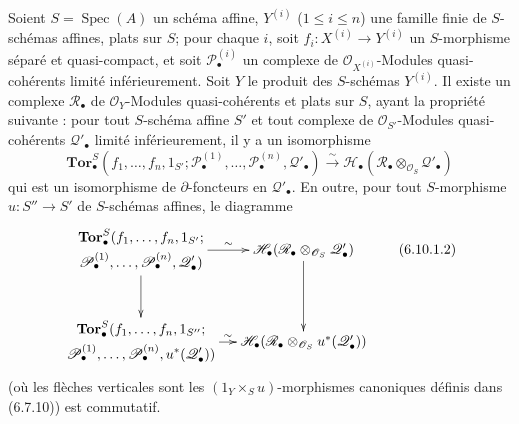 \begin{proposition}[6.10.1]
Soient $S=\operatorname{Spec}(A)$ un schéma affine,
$Y^{(i)}$ ($1\leq i\leq n$) une famille finie de $S$-schémas affines, plats
sur $S$; pour chaque $i$, soit $f_i:X^{(i)}\to Y^{(i)}$ un $S$-morphisme
séparé et quasi-compact, et soit $\mathscr P_\bullet^{(i)}$ un complexe de
$\mathscr O_{X^{(i)}}$-Modules quasi-cohérents limité inférieurement. Soit
$Y$ le produit des $S$-schémas $Y^{(i)}$. Il existe un complexe
$\mathscr R_\bullet$ de $\mathscr O_Y$-Modules quasi-cohérents et plats sur
$S$, ayant la propriété suivante : pour tout $S$-schéma affine $S'$ et tout
complexe de $\mathscr O_{S'}$-Modules quasi-cohérents
$\mathscr Q'_\bullet$ limité inférieurement, il y a un isomorphisme
\[
  \mathbf{Tor}_\bullet^S
  (f_1,\ldots,f_n,1_{S'};
   \mathscr P_\bullet^{(1)},\ldots,\mathscr P_\bullet^{(n)},
   \mathscr Q'_\bullet)
  \xrightarrow{\sim}
  \mathscr H_\bullet
  (\mathscr R_\bullet\otimes_{\mathscr O_S}\mathscr Q'_\bullet)
  \tag{6.10.1.1}\label{III.6.10.1.1.fr}
\]
qui est un isomorphisme de $\partial$-foncteurs en $\mathscr Q'_\bullet$. En
outre, pour tout $S$-morphisme $u:S''\to S'$ de $S$-schémas affines, le
diagramme
\[
\xymatrix@C=12pt@R=30pt{
  {\begin{gathered}
    \mathbf{Tor}_\bullet^S
    (f_1,\ldots,f_n,1_{S'};\\
    \mathscr P_\bullet^{(1)},\ldots,\mathscr P_\bullet^{(n)},
    \mathscr Q'_\bullet)
  \end{gathered}}
  \ar[r]^-{\sim}\ar[d]
  &
  {\mathscr H_\bullet
    (\mathscr R_\bullet\otimes_{\mathscr O_S}\mathscr Q'_\bullet)}
  \ar[d]
  \\
  {\begin{gathered}
    \mathbf{Tor}_\bullet^S
    (f_1,\ldots,f_n,1_{S''};\\
    \mathscr P_\bullet^{(1)},\ldots,\mathscr P_\bullet^{(n)},
    u^*(\mathscr Q'_\bullet))
  \end{gathered}}
  \ar[r]^-{\sim}
  &
  {\mathscr H_\bullet
    (\mathscr R_\bullet\otimes_{\mathscr O_S}u^*(\mathscr Q'_\bullet))}
}
\tag{6.10.1.2}\label{III.6.10.1.2.fr}
\]
(où les flèches verticales sont les $(1_Y\times_Su)$-morphismes canoniques
définis dans (6.7.10)) est commutatif.
\end{proposition}

